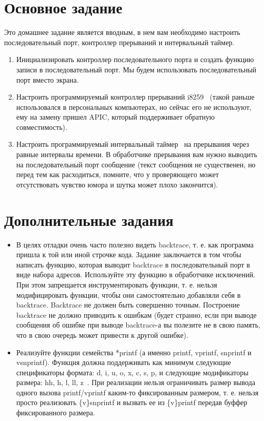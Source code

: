 \section{Основное задание}

Это домашнее задание является вводным, в нем вам необходимо настроить
последовательный порт, контроллер прерываний и интервальный таймер.

\begin{enumerate}
  \item Инициализировать контроллер последовательного порта и создать функцию
        записи в последовательный порт. Мы будем использовать последовательный
        порт вместо экрана.
  \item Настроить программируемый контроллер прерываний i8259~\cite{INTEL:8259}
        (такой раньше использовался в персональных компьютерах, но сейчас его не
        используют, ему на замену пришел APIC, который поддерживает обратную
        совместимость).
  \item Настроить программируемый интервальный таймер~\cite{INTEL:8253} на
        прерывания через равные интервалы времени. В обработчике прерывания вам
        нужно выводить на последовательный порт сообщение (текст сообщения не
        существенен, но перед тем как расходиться, помните, что у проверяющего
        может отсутствовать чувство юмора и шутка может плохо закончится).
\end{enumerate}

\section{Дополнительные задания}

\begin{itemize}
  \item В целях отладки очень часто полезно видеть backtrace, т. е. как
        программа пришла к той или иной строчке кода. Задание заключается в том
        чтобы написать функцию, которая выводит backtrace в последовательный
        порт в виде набора адресов. Используйте эту функцию в обработчике
        исключений. При этом запрещается инструментировать функции, т. е.
        нельзя модифицировать функции, чтобы они самостоятельно добавляли себя
        в backtrace. Backtrace не должен быть совершенно точным. Построение
        backtrace не должно приводить к ошибкам (будет странно, если при выводе
        сообщения об ошибке при выводе backtrace-а вы полезите не в свою память,        что в свою очередь может привести к другой ошибке).
  \item Реализуйте функции семейства *printf (а именно printf, vprintf,
        snprintf и vsnprintf). Функция должна поддерживать как минимум
        следующие спецификаторы формата: d, i, u, o, x, c, s, p, и следующие
        модификаторы размера: hh, h, l, ll, z~\cite{CPP:PRINTF}. При реализации
        нельзя ограничивать размер вывода одного вызова printf/vprintf каким-то
        фиксированным размером, т. е. нельзя просто реализовать \{v\}snprintf и
        вызвать ее из \{v\}printf передав буффер фиксированного размера. 
\end{itemize}
